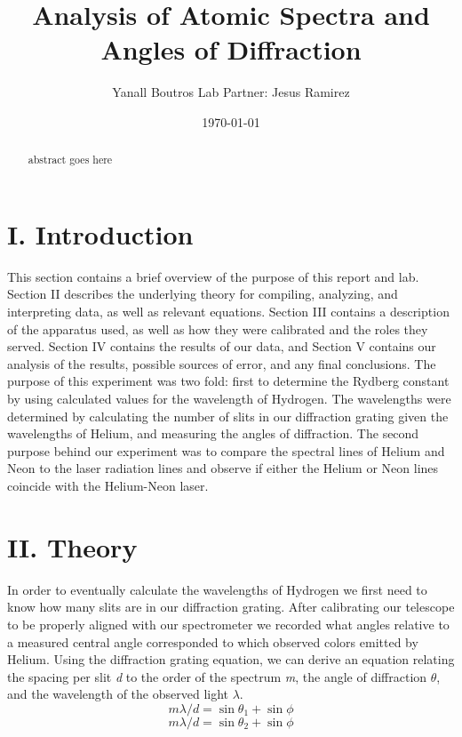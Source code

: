 \documentclass{article}
\begin{document}
\title{Analysis of Atomic Spectra and Angles of Diffraction}
\author{Yanall Boutros Lab Partner: Jesus Ramirez}
\date{\today}
\maketitle
\begin{abstract}
abstract goes here
\end{abstract}

\section*{I. Introduction}
\indent\indent This section contains a brief overview of the purpose of this report and lab. Section II describes the underlying theory for compiling, analyzing, and interpreting data, as well as relevant equations. Section III contains a description of the apparatus used, as well as how they were calibrated and the roles they served. Section IV contains the results of our data, and Section V contains our analysis of the results, possible sources of error, and any final conclusions. \newline The purpose of this experiment was two fold: first to determine the Rydberg constant by using calculated values for the wavelength of Hydrogen. The wavelengths were determined by calculating the number of slits in our diffraction grating given the wavelengths of Helium, and measuring the angles of diffraction. The second purpose behind our experiment was to compare the spectral lines of Helium and Neon to the laser radiation lines and observe if either the Helium or Neon lines coincide with the Helium-Neon laser.  

\section*{II. Theory}
\indent\indent In order to eventually calculate the wavelengths of Hydrogen we first need to know how many slits are in our diffraction grating. After calibrating our telescope to be properly aligned with our spectrometer we recorded what angles relative to a measured central angle corresponded to which observed colors emitted by Helium. Using the diffraction grating equation, we can derive an equation relating the spacing per slit \textit{d} to the order of the spectrum \textit{m}, the angle of diffraction \textit{$\theta$}, and the wavelength of the observed light \textit{$\lambda$}. 
\begin{equation}m\lambda/d = \sin\theta_1 + \sin\phi\end{equation}
\begin{equation}m\lambda/d = \sin\theta_2 + \sin\phi\end{equation}
\end{document}
